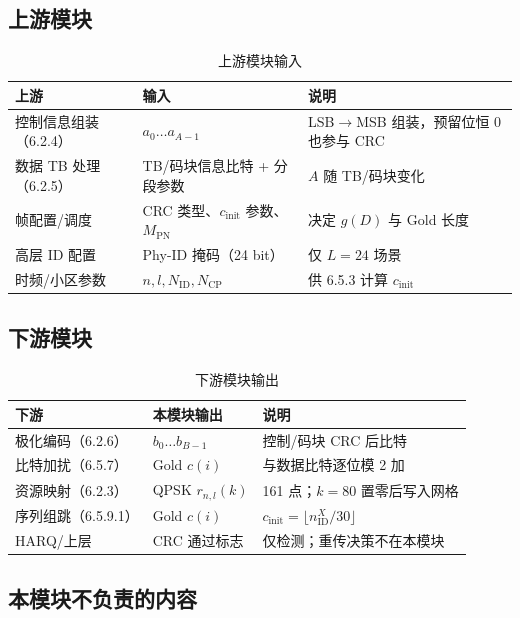 \documentclass[11pt,a4paper]{ctexart}
\begin{document}
\subsection{上游模块}

\begin{longtable}{L{4.2cm}L{4.5cm}L{5.5cm}}
\caption{上游模块输入\label{tab:6513-up}} \\
\toprule
\textbf{上游} & \textbf{输入} & \textbf{说明} \\
\midrule
控制信息组装（6.2.4） & $a_0\ldots a_{A-1}$ & LSB$\rightarrow$MSB 组装，预留位恒 0 也参与 CRC \\
数据 TB 处理（6.2.5） & TB/码块信息比特 + 分段参数 & $A$ 随 TB/码块变化 \\
帧配置/调度 & CRC 类型、$c_{\mathrm{init}}$ 参数、$M_{\mathrm{PN}}$ & 决定 $g(D)$ 与 Gold 长度 \\
高层 ID 配置 & Phy-ID 掩码（24 bit） & 仅 $L{=}24$ 场景 \\
时频/小区参数 & $n,l,N_{\mathrm{ID}},N_{\mathrm{CP}}$ & 供 6.5.3 计算 $c_{\mathrm{init}}$ \\
\bottomrule
\end{longtable}

\subsection{下游模块}

\begin{longtable}{L{4.2cm}L{4.5cm}L{5.5cm}}
\caption{下游模块输出\label{tab:6513-down}} \\
\toprule
\textbf{下游} & \textbf{本模块输出} & \textbf{说明} \\
\midrule
极化编码（6.2.6） & $b_0\ldots b_{B-1}$ & 控制/码块 CRC 后比特 \\
比特加扰（6.5.7） & Gold $c(i)$ & 与数据比特逐位模 2 加 \\
资源映射（6.2.3） & QPSK $r_{n,l}(k)$ & 161 点；$k{=}80$ 置零后写入网格 \\
序列组跳（6.5.9.1） & Gold $c(i)$ & $c_{\mathrm{init}}=\lfloor n_{\mathrm{ID}}^X/30\rfloor$ \\
HARQ/上层 & CRC 通过标志 & 仅检测；重传决策不在本模块 \\
\bottomrule
\end{longtable}

\subsection{本模块不负责的内容}
\end{document}
